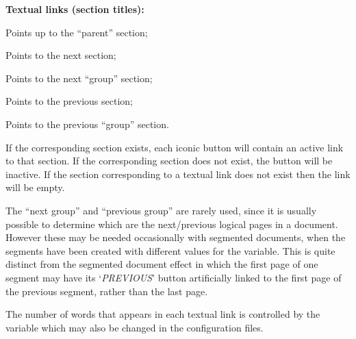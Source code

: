 %
\html{\\}\noindent
\textbf{Textual links (section titles):}
\begin{htmllist}\latex{\addtolength{\leftskip}{15pt}}%
\item [\fn{\$UP\_TITLE}]  Points up to the ``parent'' section;
\item [\fn{\$NEXT\_TITLE}] Points to the next section;
\item [\fn{\$NEXT\_GROUP\_TITLE}] Points to the next ``group'' section;
\item [\fn{\$PREVIOUS\_TITLE}] Points to the previous section;
\item [\fn{\$PREVIOUS\_GROUP\_TITLE}] Points to the previous ``group'' section.
\end{htmllist}
If the corresponding section exists, each iconic button will contain an
active link to that section. If the corresponding section does
not exist, the button will be inactive. If the section corresponding
to a textual link does not exist then the link will be empty.

The ``next group'' and ``previous group'' are rarely used, 
since it is usually possible to determine
which are the next/previous logical pages in a document.
However these may be needed occasionally with segmented documents,
when the segments have been created with different values
for the  variable. 
This is quite distinct from the segmented document effect 
in which the first page of one segment may have its `\emph{PREVIOUS}'
button artificially linked to the first page of the previous segment, 
rather than the last page.


\html{\\}\noindent
The number of words that appears in each textual link
is controlled by the variable 
which may also be changed in the configuration files.

